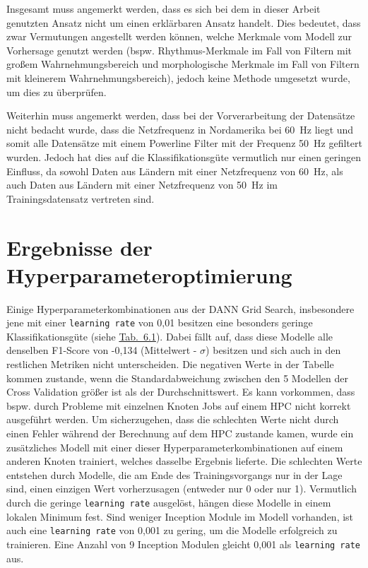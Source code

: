 Insgesamt muss angemerkt werden, dass es sich bei dem in dieser Arbeit genutzten Ansatz nicht um einen erklärbaren Ansatz handelt. Dies bedeutet, dass zwar Vermutungen angestellt werden können, welche Merkmale vom Modell zur Vorhersage genutzt werden (bspw. Rhythmus-Merkmale im Fall von Filtern mit großem Wahrnehmungsbereich und morphologische Merkmale im Fall von Filtern mit kleinerem Wahrnehmungsbereich), jedoch keine Methode umgesetzt wurde, um dies zu überprüfen.

Weiterhin muss angemerkt werden, dass bei der Vorverarbeitung der Datensätze nicht bedacht wurde, dass die Netzfrequenz in Nordamerika bei 60~Hz liegt und somit alle Datensätze mit einem Powerline Filter mit der Frequenz 50~Hz gefiltert wurden. Jedoch hat dies auf die Klassifikationsgüte vermutlich nur einen geringen Einfluss, da sowohl Daten aus Ländern mit einer Netzfrequenz von 60~Hz, als auch Daten aus Ländern mit einer Netzfrequenz von 50~Hz im Trainingsdatensatz vertreten sind.   

\section{Ergebnisse der Hyperparameteroptimierung}\label{sec:diskhyper}

Einige Hyperparameterkombinationen aus der \gls{DANN} Grid Search, insbesondere jene mit einer \texttt{learning rate} von 0,01 besitzen eine besonders geringe  Klassifikationsgüte (siehe \hyperref[tab:GridSearch_DANN]{Tab.~6.1}). Dabei fällt auf, dass diese Modelle alle denselben F1-Score von -0,134 (Mittelwert - $\sigma$) besitzen und sich auch in den restlichen Metriken nicht unterscheiden. Die negativen Werte in der Tabelle kommen zustande, wenn die Standardabweichung zwischen den 5 Modellen der Cross Validation größer ist als der Durchschnittswert. Es kann vorkommen, dass bspw. durch Probleme mit einzelnen Knoten Jobs auf einem \gls{HPC} nicht korrekt ausgeführt werden. Um sicherzugehen, dass die schlechten Werte nicht durch einen Fehler während der Berechnung auf dem \gls{HPC} zustande kamen, wurde ein zusätzliches Modell mit einer dieser Hyperparameterkombinationen auf einem anderen Knoten trainiert, welches dasselbe Ergebnis lieferte. Die schlechten Werte entstehen durch Modelle, die am Ende des Trainingsvorgangs nur in der Lage sind, einen einzigen Wert vorherzusagen (entweder nur 0 oder nur 1). Vermutlich durch die geringe \texttt{learning rate} ausgelöst, hängen diese Modelle in einem lokalen Minimum fest. Sind weniger Inception Module im Modell vorhanden, ist auch eine \texttt{learning rate} von 0,001 zu gering, um die Modelle erfolgreich zu trainieren. Eine Anzahl von 9 Inception Modulen gleicht 0,001 als \texttt{learning rate} aus.


